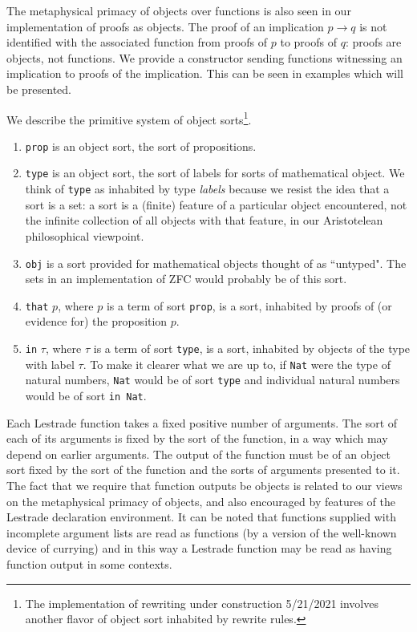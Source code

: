 \documentclass[12pt]{article}
\begin{document}
The metaphysical primacy of objects over functions is also seen in our implementation of proofs as objects.  The proof of an implication $p \rightarrow q$ is not identified with
the associated function from proofs of $p$ to proofs of $q$:  proofs are objects, not functions.  We provide a constructor sending functions witnessing an implication to proofs of the implication.  This can be seen in examples which will be presented.

We describe the primitive system of object sorts\footnote{The implementation of rewriting under construction 5/21/2021 involves another flavor of object sort inhabited by rewrite rules.}. 

\begin{enumerate}

\item  {\tt prop} is an object sort, the sort of propositions.

\item {\tt type} is an object sort, the sort of labels for sorts of mathematical object.  We think of {\tt type} as inhabited by type {\em labels\/}  because we resist the idea that a sort is a set:  a sort is a (finite) feature of a particular object encountered, not the infinite collection of all objects with that feature, in our Aristotelean philosophical viewpoint.

\item  {\tt obj} is a sort provided for mathematical objects thought of as ``untyped".  The sets in an implementation of ZFC would probably be of this sort.

\item  {\tt that} $p$, where $p$ is a term of sort {\tt prop}, is a sort, inhabited by proofs of (or evidence for) the proposition $p$.

\item {\tt in} $\tau$, where $\tau$ is a term of sort {\tt type}, is a sort, inhabited by objects of the type with label $\tau$.  To make it clearer what we are up to, if {\tt Nat} were the type of natural numbers, {\tt Nat} would be of sort {\tt type} and individual natural numbers would be of sort {\tt in Nat}.

\end{enumerate}

Each Lestrade function takes a fixed positive number of arguments.  The sort of each of its arguments is fixed by the sort of the function, in a way which may depend
on earlier arguments.  The output of the function must be of an object sort fixed by the sort of the function and the sorts of arguments presented to it.  The fact that we require that function outputs be objects is related to
our views on the metaphysical primacy of objects, and also encouraged by features of the Lestrade declaration environment.  It can be noted that functions supplied with incomplete
argument lists are read as functions (by a version of the well-known device of currying) and in this way a Lestrade function may be read as having function output in some contexts.
\end{document}
